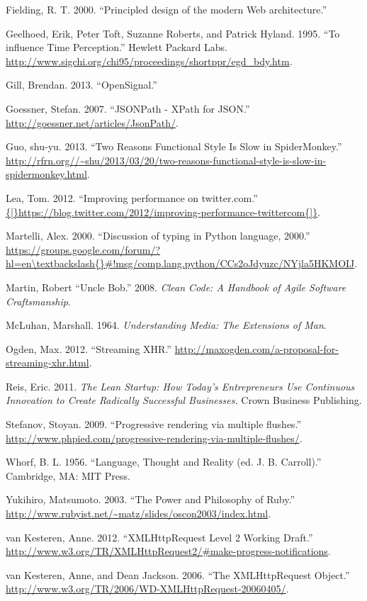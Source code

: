 \documentclass[]{article}
\begin{document}
Fielding, R. T. 2000. ``Principled design of the modern Web
architecture.''

Geelhoed, Erik, Peter Toft, Suzanne Roberts, and Patrick Hyland. 1995.
``To influence Time Perception.'' Hewlett Packard Labs.
\url{http://www.sigchi.org/chi95/proceedings/shortppr/egd_bdy.htm}.

Gill, Brendan. 2013. ``OpenSignal.''

Goessner, Stefan. 2007. ``JSONPath - XPath for JSON.''
\url{http://goessner.net/articles/JsonPath/}.

Guo, shu-yu. 2013. ``Two Reasons Functional Style Is Slow in
SpiderMonkey.''
\url{http://rfrn.org//~shu/2013/03/20/two-reasons-functional-style-is-slow-in-spidermonkey.html}.

Lea, Tom. 2012. ``Improving performance on twitter.com.''
\url{{[}https://blog.twitter.com/2012/improving-performance-twittercom{]}}.

Martelli, Alex. 2000. ``Discussion of typing in Python language, 2000.''
\url{https://groups.google.com/forum/?hl=en\textbackslash{}\#!msg/comp.lang.python/CCs2oJdyuzc/NYjla5HKMOIJ}.

Martin, Robert ``Uncle Bob.'' 2008. \emph{Clean Code: A Handbook of
Agile Software Craftsmanship}.

McLuhan, Marshall. 1964. \emph{Understanding Media: The Extensions of
Man}.

Ogden, Max. 2012. ``Streaming XHR.''
\url{http://maxogden.com/a-proposal-for-streaming-xhr.html}.

Reis, Eric. 2011. \emph{The Lean Startup: How Today's Entrepreneurs Use
Continuous Innovation to Create Radically Successful Businesses.} Crown
Business Publishing.

Stefanov, Stoyan. 2009. ``Progressive rendering via multiple flushes.''
\url{http://www.phpied.com/progressive-rendering-via-multiple-flushes/}.

Whorf, B. L. 1956. ``Language, Thought and Reality (ed. J. B.
Carroll).'' Cambridge, MA: MIT Press.

Yukihiro, Matsumoto. 2003. ``The Power and Philosophy of Ruby.''
\url{http://www.rubyist.net/~matz/slides/oscon2003/index.html}.

van Kesteren, Anne. 2012. ``XMLHttpRequest Level 2 Working Draft.''
\url{http://www.w3.org/TR/XMLHttpRequest2/\#make-progress-notifications}.

van Kesteren, Anne, and Dean Jackson. 2006. ``The XMLHttpRequest
Object.'' \url{http://www.w3.org/TR/2006/WD-XMLHttpRequest-20060405/}.
\end{document}

